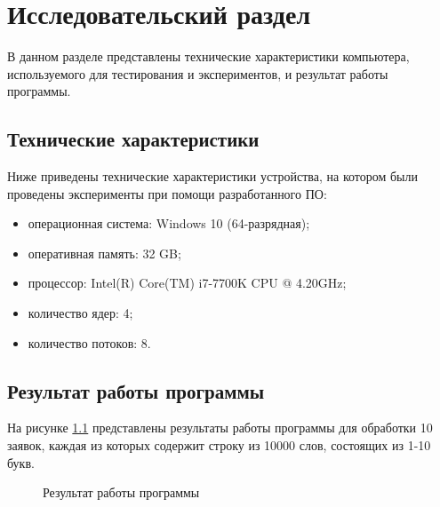 \chapter{Исследовательский раздел}
В данном разделе представлены технические характеристики компьютера, используемого для тестирования и экспериментов, и результат работы программы.
 \section{Технические характеристики}

Ниже приведены технические характеристики устройства, на котором были проведены эксперименты при помощи разработанного ПО:

\begin{itemize}
	\item операционная система: Windows 10 (64-разрядная);
	\item оперативная память: 32 GB;
	\item процессор: Intel(R) Core(TM) i7-7700K CPU @ 4.20GHz;
	\item количество ядер: 4;
	\item количество потоков: 8.
\end{itemize}

\section{Результат работы программы}
На рисунке \ref{results} представлены результаты работы программы для обработки 10 заявок, каждая из которых содержит строку из 10000 слов, состоящих из 1-10 букв.

\begin{figure}[h]
	\caption{Результат работы программы}
	\label{results}
\end{figure}

